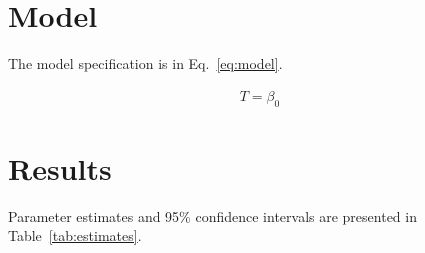 \documentclass[11pt]{article}
\begin{document}
\section{Model}

The model specification is in Eq.~\ref{eq:model}.

\begin{gather}
    \label{eq:model}
    T = \beta_0
\end{gather}

\section{Results}

Parameter estimates and 95\% confidence intervals
are presented in Table~\ref{tab:estimates}.


\end{document}

